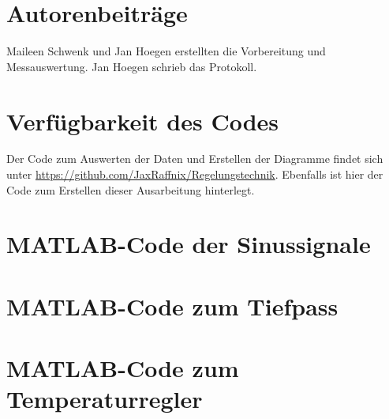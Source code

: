 \documentclass[
    paper=a4,
    fontsize=10pt,
    DIV=13,
    oneside,
]{scrartcl}
\begin{document}

\printbibliography[heading=bibnumbered]

\section{Autorenbeiträge}
    Maileen Schwenk und Jan Hoegen erstellten die Vorbereitung und Messauswertung. Jan Hoegen schrieb das Protokoll.

\section{Verfügbarkeit des Codes}
    Der Code zum Auswerten der Daten und Erstellen der Diagramme findet sich unter \url{https://github.com/JaxRaffnix/Regelungstechnik}. Ebenfalls ist hier der Code zum Erstellen dieser Ausarbeitung hinterlegt.


\appendix

\section{MATLAB-Code der Sinussignale}
    

\section{MATLAB-Code zum Tiefpass}
    

\section{MATLAB-Code zum Temperaturregler}
    
\end{document}
